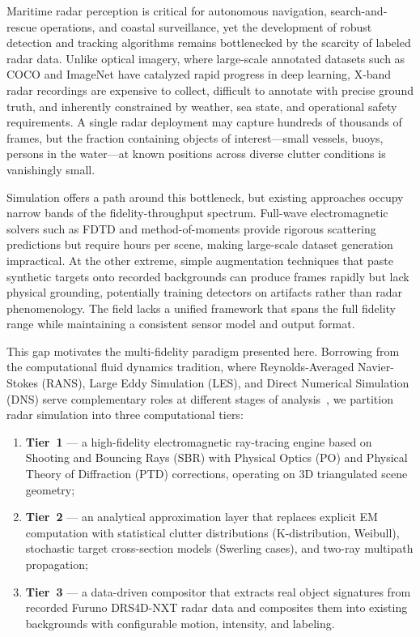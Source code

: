 \documentclass[conf]{new-aiaa}
\begin{document}
Maritime radar perception is critical for autonomous navigation, search-and-rescue operations, and coastal surveillance, yet the development of robust detection and tracking algorithms remains bottlenecked by the scarcity of labeled radar data. Unlike optical imagery, where large-scale annotated datasets such as COCO and ImageNet have catalyzed rapid progress in deep learning, X-band radar recordings are expensive to collect, difficult to annotate with precise ground truth, and inherently constrained by weather, sea state, and operational safety requirements. A single radar deployment may capture hundreds of thousands of frames, but the fraction containing objects of interest---small vessels, buoys, persons in the water---at known positions across diverse clutter conditions is vanishingly small.

Simulation offers a path around this bottleneck, but existing approaches occupy narrow bands of the fidelity-throughput spectrum. Full-wave electromagnetic solvers such as FDTD and method-of-moments provide rigorous scattering predictions but require hours per scene, making large-scale dataset generation impractical. At the other extreme, simple augmentation techniques that paste synthetic targets onto recorded backgrounds can produce frames rapidly but lack physical grounding, potentially training detectors on artifacts rather than radar phenomenology. The field lacks a unified framework that spans the full fidelity range while maintaining a consistent sensor model and output format.

This gap motivates the multi-fidelity paradigm presented here. Borrowing from the computational fluid dynamics tradition, where Reynolds-Averaged Navier-Stokes (RANS), Large Eddy Simulation (LES), and Direct Numerical Simulation (DNS) serve complementary roles at different stages of analysis~\cite{Peherstorfer2018}, we partition radar simulation into three computational tiers:
\begin{enumerate}
    \item \textbf{Tier~1} --- a high-fidelity electromagnetic ray-tracing engine based on Shooting and Bouncing Rays (SBR) with Physical Optics (PO) and Physical Theory of Diffraction (PTD) corrections, operating on 3D triangulated scene geometry;
    \item \textbf{Tier~2} --- an analytical approximation layer that replaces explicit EM computation with statistical clutter distributions (K-distribution, Weibull), stochastic target cross-section models (Swerling cases), and two-ray multipath propagation;
    \item \textbf{Tier~3} --- a data-driven compositor that extracts real object signatures from recorded Furuno DRS4D-NXT radar data and composites them into existing backgrounds with configurable motion, intensity, and labeling.
\end{enumerate}
\end{document}
